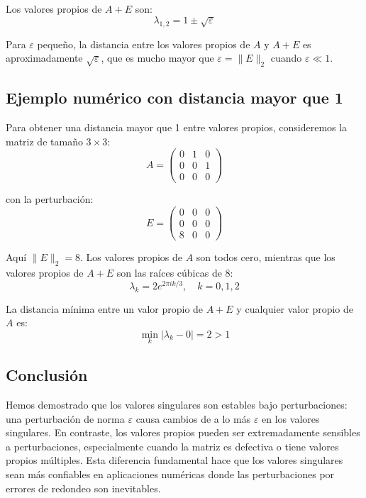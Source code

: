 \documentclass[12pt]{article}
\begin{document}
Los valores propios de $A + E$ son:
\[
\lambda_{1,2} = 1 \pm \sqrt{\varepsilon}
\]

Para $\varepsilon$ pequeño, la distancia entre los valores propios de $A$ y $A + E$ es aproximadamente $\sqrt{\varepsilon}$, que es mucho mayor que $\varepsilon = \|E\|_2$ cuando $\varepsilon \ll 1$.

\subsection{Ejemplo numérico con distancia mayor que 1}

Para obtener una distancia mayor que 1 entre valores propios, consideremos la matriz de tamaño $3 \times 3$:
\[
A = \begin{pmatrix}
0 & 1 & 0 \\
0 & 0 & 1 \\
0 & 0 & 0
\end{pmatrix}
\]

con la perturbación:
\[
E = \begin{pmatrix}
0 & 0 & 0 \\
0 & 0 & 0 \\
8 & 0 & 0
\end{pmatrix}
\]

Aquí $\|E\|_2 = 8$. Los valores propios de $A$ son todos cero, mientras que los valores propios de $A + E$ son las raíces cúbicas de 8:
\[
\lambda_k = 2e^{2\pi i k/3}, \quad k = 0, 1, 2
\]

La distancia mínima entre un valor propio de $A + E$ y cualquier valor propio de $A$ es:
\[
\min_k |\lambda_k - 0| = 2 > 1
\]

\subsection{Conclusión}

Hemos demostrado que los valores singulares son estables bajo perturbaciones: una perturbación de norma $\varepsilon$ causa cambios de a lo más $\varepsilon$ en los valores singulares. En contraste, los valores propios pueden ser extremadamente sensibles a perturbaciones, especialmente cuando la matriz es defectiva o tiene valores propios múltiples. Esta diferencia fundamental hace que los valores singulares sean más confiables en aplicaciones numéricas donde las perturbaciones por errores de redondeo son inevitables.

\vspace{2cm}

\end{document}
